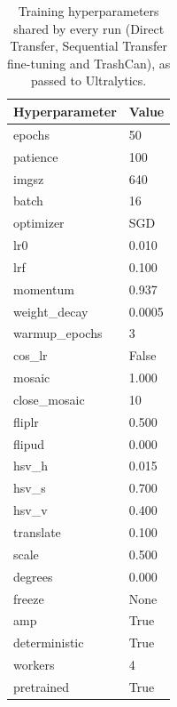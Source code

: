 \begin{table}[htbp]
\centering
\caption{Training hyperparameters shared by every run (Direct Transfer, Sequential Transfer fine-tuning and TrashCan), as passed to Ultralytics.}
\label{tab:hparams}
\begin{tabular}{ll}
\toprule
Hyperparameter & Value \\
\midrule
epochs & 50 \\
patience & 100 \\
imgsz & 640 \\
batch & 16 \\
optimizer & SGD \\
lr0 & 0.010 \\
lrf & 0.100 \\
momentum & 0.937 \\
weight\_decay & 0.0005 \\
warmup\_epochs & 3 \\
cos\_lr & False \\
mosaic & 1.000 \\
close\_mosaic & 10 \\
fliplr & 0.500 \\
flipud & 0.000 \\
hsv\_h & 0.015 \\
hsv\_s & 0.700 \\
hsv\_v & 0.400 \\
translate & 0.100 \\
scale & 0.500 \\
degrees & 0.000 \\
freeze & None \\
amp & True \\
deterministic & True \\
workers & 4 \\
pretrained & True \\
\bottomrule
\end{tabular}
\end{table}
